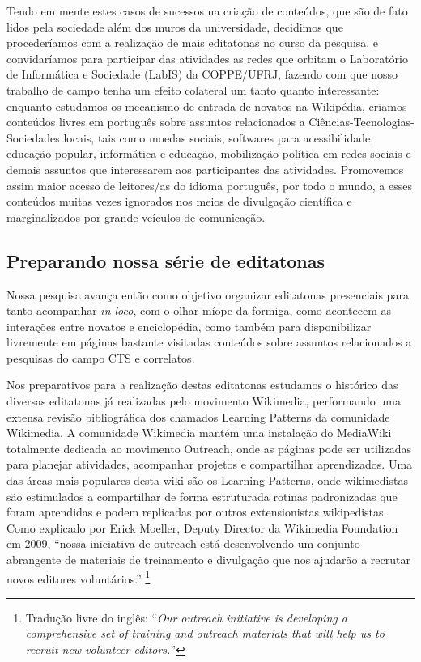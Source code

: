 Tendo em mente estes casos de sucessos na criação de conteúdos, que são de fato lidos pela sociedade além dos muros da universidade, decidimos que procederíamos com a realização de mais editatonas no curso da pesquisa, e convidaríamos para participar das atividades as redes que orbitam o Laboratório de Informática e Sociedade (LabIS) da COPPE/UFRJ, fazendo com que nosso trabalho de campo tenha um efeito colateral um tanto quanto interessante: enquanto estudamos os mecanismo de entrada de novatos na Wikipédia, criamos conteúdos livres em português sobre assuntos relacionados a Ciências-Tecnologias-Sociedades locais, tais como moedas sociais, softwares para acessibilidade, educação popular, informática e educação, mobilização política em redes sociais e demais assuntos que interessarem aos participantes das atividades. Promovemos assim maior acesso de leitores/as do idioma português, por todo o mundo, a esses conteúdos muitas vezes ignorados nos meios de divulgação científica e marginalizados por grande veículos de comunicação.

\subsection{Preparando nossa série de editatonas}

Nossa pesquisa avança então como objetivo organizar editatonas presenciais para tanto acompanhar \textit{in loco}, com o olhar míope da formiga, como acontecem as interações entre novatos e enciclopédia, como também para disponibilizar livremente em páginas bastante visitadas conteúdos sobre assuntos relacionados a pesquisas do campo CTS e correlatos.

Nos preparativos para a realização destas editatonas estudamos o histórico das diversas editatonas já realizadas pelo movimento Wikimedia, performando uma extensa revisão bibliográfica dos chamados Learning Patterns da comunidade Wikimedia. A comunidade Wikimedia mantém uma instalação do MediaWiki totalmente dedicada ao movimento Outreach, onde as páginas pode ser utilizadas para planejar atividades, acompanhar projetos e compartilhar aprendizados. Uma das áreas mais populares desta wiki são os Learning Patterns, onde wikimedistas são estimulados a compartilhar de forma estruturada rotinas padronizadas que foram aprendidas e podem replicadas por outros extensionistas wikipedistas. Como explicado por Erick Moeller, Deputy Director da Wikimedia Foundation em 2009, ``nossa iniciativa de outreach está desenvolvendo um conjunto abrangente de materiais de treinamento e divulgação que nos ajudarão a recrutar novos editores voluntários.'' \cite{moeller_wikipedias_2009}\footnote{Tradução livre do inglês: ``\textit{Our outreach initiative is developing a comprehensive set of training and outreach materials that will help us to recruit new volunteer editors.}''}

